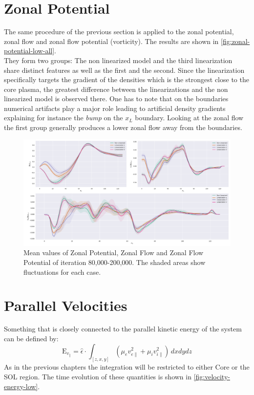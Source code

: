 \documentclass[master.tex]{subfiles}
\begin{document}
\section{Zonal Potential}

The same procedure of the previous section is applied to the zonal potential, zonal flow and zonal flow potential (vorticity). The results are shown in \autoref{fig:zonal-potential-low-all}.\\
They form two groups: The non linearized model and the third linearization share distinct features as well as the first and the second. Since the linearization specifically targets the gradient of the densities which is the strongest close to the core plasma, the greatest difference between the linearizations and the non linearized model is observed there. One has to note that on the boundaries numerical artifacts play a major role leading to artificial density gradients explaining for instance the \textit{bump} on the $x_L$ boundary. Looking at the zonal flow the first group generally produces a lower zonal flow away from the boundaries.

\begin{figure}[!htbp]
    \includegraphics[width=\linewidth]{pdfs/zonal_potential_low.pdf}
    \caption{Mean values of Zonal Potential, Zonal Flow and Zonal Flow Potential of iteration 80,000-200,000. The shaded areas show fluctuations for each case.}
    \label{fig:zonal-potential-low-all}
\end{figure}

\section{Parallel Velocities}\label{sec:polar_parallel_velocities}

Something that is closely connected to the parallel kinetic energy of the system can be defined by:
\begin{equation}
    \mathrm{E}_{v_\parallel} = \hat{\epsilon} \cdot \int_{[z,x,y]} \left( \mu_ev_{e\parallel}^2 + \mu_iv_{i\parallel }^2 \right) \, dxdydz
\end{equation}
As in the previous chapters the integration will be restricted to either Core or the \ac{SOL} region. The time evolution of these quantities is shown in \autoref{fig:velocity-energy-low}.
\end{document}
